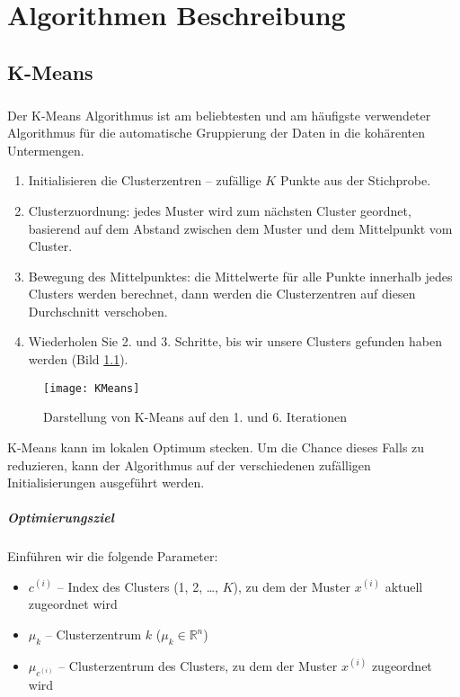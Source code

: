 \chapter{Algorithmen Beschreibung}

\section{K-Means}

\paragraph{}
Der K-Means Algorithmus ist am beliebtesten und am h\"aufigste verwendeter Algorithmus f\"ur die automatische Gruppierung der Daten in die koh\"arenten Untermengen.

\begin{enumerate}
\item Initialisieren die Clusterzentren -- zuf\"allige $K$ Punkte aus der Stichprobe.
\item Clusterzuordnung: jedes Muster wird zum n\"achsten Cluster geordnet, basierend auf dem Abstand zwischen dem Muster und dem Mittelpunkt vom Cluster.
\item Bewegung des Mittelpunktes: die Mittelwerte f\"ur alle Punkte innerhalb jedes Clusters werden berechnet, dann werden die Clusterzentren auf diesen Durchschnitt verschoben.
\item Wiederholen Sie 2. und 3. Schritte, bis wir unsere Clusters gefunden haben werden (Bild \ref{fig:kmeans}).
\end{enumerate}

\begin{figure}[ht]
\centering
\texttt{[image: KMeans]}
\caption{Darstellung von K-Means auf den 1. und 6. Iterationen}
\label{fig:kmeans}
\end{figure}

K-Means kann im lokalen Optimum stecken. Um die Chance dieses Falls zu reduzieren, kann der Algorithmus auf der verschiedenen zuf\"alligen Initialisierungen ausgef\"uhrt werden.

\paragraph{Optimierungsziel\\}
Einf\"uhren wir die folgende Parameter:
\begin{itemize}
\item $c^{(i)}$ -- Index des Clusters (1, 2, \dots, $K$), zu dem der Muster $x^{(i)}$ aktuell zugeordnet wird
\item $\mu_{k}$ -- Clusterzentrum $k$ ($\mu_{k} \in \mathbb{R}^{n}$)
\item $\mu_{c^{(i)}}$  -- Clusterzentrum des Clusters, zu dem der Muster $x^{(i)}$ zugeordnet wird
\end{itemize}

